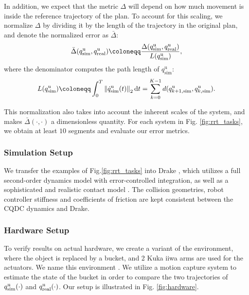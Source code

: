 In addition, we expect that the metric $\Delta$ will depend on how much movement is inside the reference trajectory of the plan. To account for this scaling, we normalize $\Delta$ by dividing it by the length of the trajectory in the original plan, and denote the normalized error as $\bar{\Delta}$:
\begin{equation}
\bar{\Delta}(\qusimp, \qurealp) \coloneqq 
\frac{\Delta (q_\mathrm{sim}^\mathrm{u}, q_\mathrm{real}^\mathrm{u})}
{L(q_\mathrm{sim}^\mathrm{u})}
,
\end{equation}
where the denominator computes the path length of $q_\mathrm{sim}^\mathrm{u}$: 
\begin{equation}
L(q_\mathrm{sim}^\mathrm{u}) \coloneqq 
\int_0^T \norm{\Dot{q}_\mathrm{sim}^\mathrm{u}(t)}_2 \mathrm{d} t =
\sum^{K - 1}_{k=0}d(q^\mathrm{u}_{k+1,\mathrm{sim}}, q^\mathrm{u}_{k,\mathrm{sim}}).
\end{equation}

This normalization also takes into account the inherent scales of the system, and makes $\bar{\Delta}(\cdot,\cdot)$ a dimensionless quantity. For each system in Fig. \ref{fig:rrt_tasks}, we obtain at least $10$ segments and evaluate our error metrics. 

\subsubsection{Simulation Setup}
We transfer the examples of Fig.\ref{fig:rrt_tasks} into Drake \cite{drake}, which utilizes a full second-order dynamics model with error-controlled integration, as well as a sophisticated and realistic contact model \cite{tamsi}. The collision geometries, robot controller stiffness and coefficients of friction are kept consistent between the CQDC dynamics and Drake. 

\subsubsection{Hardware Setup}
To verify results on actual hardware, we create a variant of the  environment, where the object is replaced by a bucket, and 2 Kuka iiwa arms are used for the actuators. We name this environment . We utilize a motion capture system to estimate the state of the bucket in order to compare the two trajectories of $q^\mathrm{u}_{\mathrm{sim}}(\cdot)$ and $q^\mathrm{u}_{\mathrm{real}}(\cdot)$. Our setup is illustrated in Fig. \ref{fig:hardware}.

